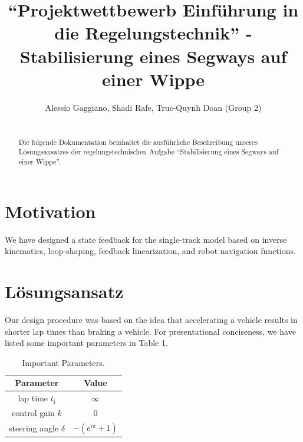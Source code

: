 \documentclass[pdf]{ifacconf}
\begin{document}
\begin{frontmatter}

\title{``Projektwettbewerb Einführung in die Regelungstechnik'' - Stabilisierung eines
Segways auf einer
Wippe}


\author{Alessio Gaggiano, Shadi Rafe, Truc-Quynh Doan (Group 2)} 

\begin{abstract}\\                          %
Die folgende Dokumentation beinhaltet die ausführliche Beschreibung unseres Lösungsansatzes der regelungstechnischen Aufgabe ``Stabilisierung eines Segways auf einer Wippe''. 
\end{abstract}

\end{frontmatter}

\section{Motivation}

We have designed a state feedback for the single-track model based on inverse kinematics, loop-shaping, feedback linearization, and robot navigation functions.

\section{Lösungsansatz}
Our design procedure was based on the idea that accelerating a vehicle results in shorter lap times than braking a vehicle. For presentational conciseness, we have listed some important parameters in Table 1.

\begin{table}[h]
\caption{Important Parameters.}
\label{table:working plan}
\centering
\begin{tabular}{|c|c|}
\hline
\bfseries Parameter & \bfseries Value \\ \hline \hline
lap time $t_{\text{f}}$ & $\infty$ \\ \hline
control gain $k$ & $0$ \\ \hline
steering angle $\delta$ & $-\left( e^{i \pi}+1\right)$ \\ \hline
 \end{tabular}
\end{table}
\end{document}
